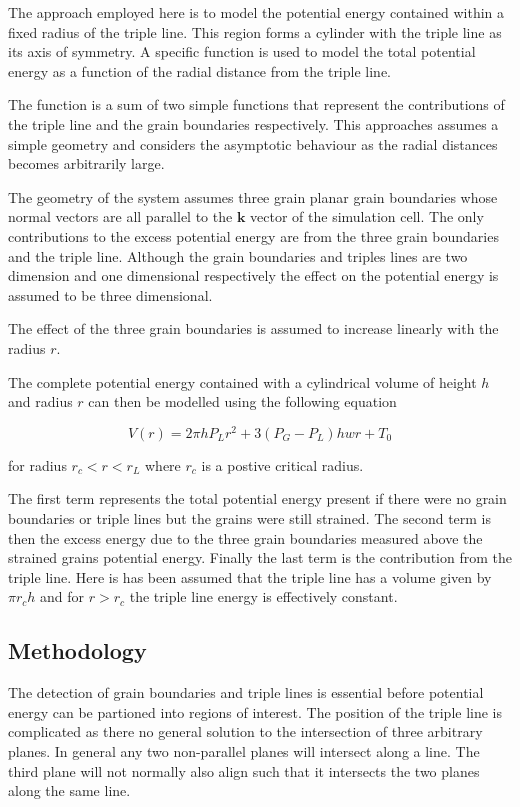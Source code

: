 \documentclass[12pt,a4paper]{book}
\begin{document}
The approach employed here is to model the potential energy contained within a fixed radius of the triple line. This region forms a cylinder with the triple line as its axis of symmetry. A specific function is used to model the total potential energy as a function of the radial distance from the triple line. 

The function is a sum of two simple functions that represent the contributions of the triple line and the grain boundaries respectively. This approaches assumes a simple geometry and considers the asymptotic behaviour as the radial distances becomes arbitrarily large.

The geometry of the system assumes three grain planar grain boundaries whose normal vectors are all parallel to the $\mathbf{k}$ vector of the simulation cell. The only contributions to the excess potential energy are from the three grain boundaries and the triple line. Although the grain boundaries and triples lines are two dimension and one dimensional respectively the effect on the potential energy is assumed to be three dimensional.

The effect of the three grain boundaries is assumed to increase linearly with the radius $r$. 


The complete potential energy contained with a cylindrical volume of height $h$ and radius $r$ can then be modelled using the following equation

\[ V(r) = 2 \pi h P_{L} r^2 + 3(P_G-P_L)h w r + T_0  
\]

for radius $r_c < r < r_L$ where $r_c$ is a postive critical radius.

The first term represents the total potential energy present if there were no grain boundaries or triple lines but the grains were still strained. The second term is then the excess energy due to the three grain boundaries measured above the strained grains potential energy. Finally the last term is the contribution from the triple line. Here is has been assumed that the triple line has a volume given by $\pi r_c h$ and for $r > r_c$ the triple line energy is effectively constant.

\subsection{Methodology}

The detection of grain boundaries and triple lines is essential before potential energy can be partioned into regions of interest. The position of the triple line is complicated as there no general solution to the intersection of three arbitrary planes. In general any two non-parallel planes will intersect along a line. The third plane will not normally also align such that it intersects the two planes along the same line.
\end{document}
